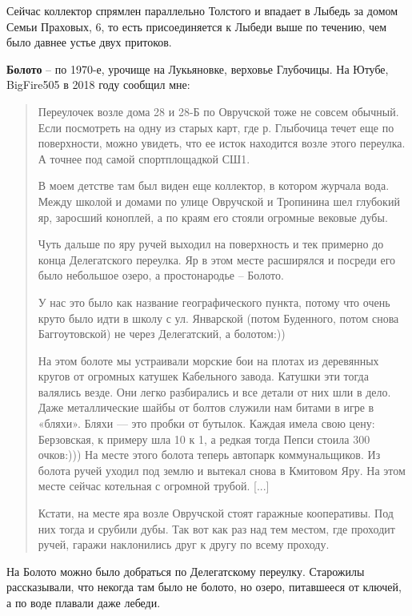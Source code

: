 Сейчас коллектор спрямлен параллельно Толстого и впадает в Лыбедь за домом Семьи Праховых, 6, то есть присоединяется к Лыбеди выше по течению, чем было давнее устье двух притоков.\\

\medskip


\textbf{Болото} – по 1970-е, урочище на Лукьяновке, верховье Глубочицы. На Ютубе, BigFire505 в 2018 году сообщил мне:

\begin{quotation}
Переулочек возле дома 28 и 28-Б по Овручской тоже не совсем обычный. Если посмотреть на одну из старых карт, где р. Глыбочица течет еще по поверхности, можно увидеть, что ее исток находится возле этого переулка. А точнее под самой спортплощадкой СШ1. 

В моем детстве там был виден еще коллектор, в котором журчала вода. Между школой и домами по улице Овручской и Тропинина шел глубокий яр, заросший коноплей, а по краям его стояли огромные вековые дубы. 

Чуть дальше по яру ручей выходил на поверхность и тек примерно до конца Делегатского переулка. Яр в этом месте расширялся и посреди его было небольшое озеро, а простонародье – Болото. 

У нас это было как название географического пункта, потому что оч\-ень круто было идти в школу с ул. Январской (потом Буденного, потом снова Баггоутовской) не через Делегатский, а болотом:))

На этом болоте мы устраивали морские бои на плотах из деревянных кругов от огромных катушек Кабельного завода. Катушки эти тогда валялись везде. Они легко разбирались и все детали от них шли в дело. Даже металлические шайбы от болтов служили нам битами в игре в «бляхи». Бляхи — это пробки от бутылок. Каждая имела свою цену: Берзовская, к примеру шла 10 к 1, а редкая тогда Пепси стоила 300 очков:))) На месте этого болота теперь автопарк коммунальщиков. Из болота ручей уходил под землю и вытекал снова в Кмитовом Яру. На этом месте сейчас котельная с огромной трубой. [...]

Кстати, на месте яра возле Овручской стоят гаражные кооперативы. Под них тогда и срубили дубы. Так вот как раз над тем местом, где проходит ручей, гаражи наклонились друг к другу по всему проходу.﻿
\end{quotation} 

На Болото можно было добраться по Делегатскому переулку. Старожилы рассказывали, что некогда там было не болото, но озеро, питавшееся от ключей, а по воде плавали даже лебеди.

